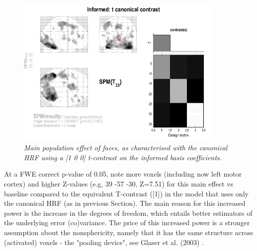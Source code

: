 \documentclass[a4paper,titlepage]{book}
\begin{document}
\begin{figure}
\begin{center}
\includegraphics[width=100mm]{faces_group/informed_t}
\caption{\em Main population effect of faces, as characterised with the canonical HRF using a [1 0 0] t-contrast on the informed basis coefficients. \label{informed_t}}
\end{center}
\end{figure}
At a FWE correct p-value of 0.05, note more voxels (including now left motor cortex) and higher Z-values (e.g, 39 -57 -30, Z=7.51) for this main effect vs baseline compared to the equivalent T-contrast ([1]) in the model that uses only the canonical HRF (as in previous Section). 
The main reason for this increased power is the increase in the degrees of freedom, which entails better estimators of the underlying error (co)variance. The price of this increased power is a stronger assumption about the nonsphericity, namely that it has the same structure across (activated) voxels - the "pooling device", see Glaser et al. (2003) \cite{daniel_hbf2}.
\end{document}
